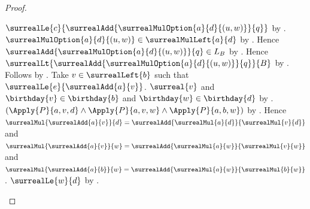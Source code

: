 \begin{proof}
\begin{subproof}
\begin{subproof}
\begin{byCase}
\begin{byCase}
                            $\surrealLe{c}
                                {\surrealAdd
                                    {\surrealMulOption{a}{d}{(u,w)}}{q}}$
                                by
                                .
                            $\surrealMulOption{a}{d}{(u,w)}
                                \in\surrealMulLeft{a}{d}$
                                by .
                            Hence $\surrealAdd
                                {\surrealMulOption{a}{d}{(u,w)}}{q}
                                \in L_B$
                                by .
                            Hence $\surrealLt
                                {\surrealAdd
                                    {\surrealMulOption{a}{d}{(u,w)}}{q}}
                                {B}$
                                by .
                            Follows by
                                .
                            Take $v\in\surrealLeft{b}$ such that
                                $\surrealLe{e}{\surrealAdd{a}{v}}$.
                            $\surreal{v}$ and
                                $\birthday{v}\in\birthday{b}$ and
                                $\birthday{w}\in\birthday{d}$
                                by .
                            $(\Apply{P}{a,v,d}
                              \land\Apply{P}{a,v,w}
                              \land\Apply{P}{a,b,w})$
                                by \auto.
                            Hence
                                $\surrealMul{\surrealAdd{a}{v}}{d}
                                    =\surrealAdd{\surrealMul{a}{d}}
                                        {\surrealMul{v}{d}}$ and
                                $\surrealMul{\surrealAdd{a}{v}}{w}
                                    =\surrealAdd{\surrealMul{a}{w}}
                                        {\surrealMul{v}{w}}$ and
                                $\surrealMul{\surrealAdd{a}{b}}{w}
                                    =\surrealAdd{\surrealMul{a}{w}}
                                        {\surrealMul{b}{w}}$.
                            $\surrealLe{w}{d}$
                                by .

\end{byCase}
\end{byCase}
\end{subproof}
\end{subproof}
\end{proof}
